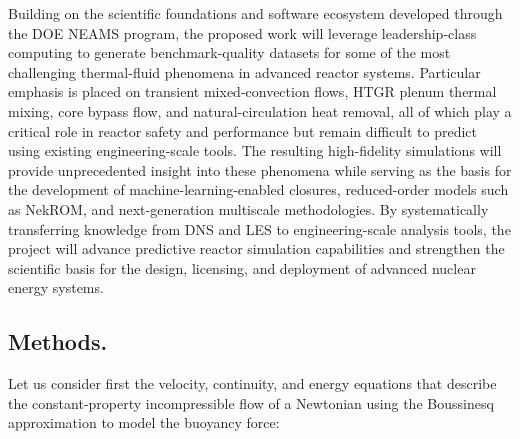 \begin{tcolorbox}[colback=gray!5,colframe=black,title=Project Vision and Goals] Building on the scientific foundations and software ecosystem developed through the DOE NEAMS program, the proposed work will leverage leadership-class computing to generate benchmark-quality datasets for some of the most challenging thermal-fluid phenomena in advanced reactor systems. Particular emphasis is placed on transient mixed-convection flows, HTGR plenum thermal mixing, core bypass flow, and natural-circulation heat removal, all of which play a critical role in reactor safety and performance but remain difficult to predict using existing engineering-scale tools. The resulting high-fidelity simulations will provide unprecedented insight into these phenomena while serving as the basis for the development of machine-learning-enabled closures, reduced-order models such as NekROM, and next-generation multiscale methodologies. By systematically transferring knowledge from DNS and LES to engineering-scale analysis tools, the project will advance predictive reactor simulation capabilities and strengthen the scientific basis for the design, licensing, and deployment of advanced nuclear energy systems. \end{tcolorbox}

\vspace{-.25in}
\subsection*{Methods.}
\vspace{-.2in}

Let us consider first  the velocity, continuity, and energy  equations that describe the constant-property incompressible flow of a Newtonian using the Boussinesq approximation to model the buoyancy force:

